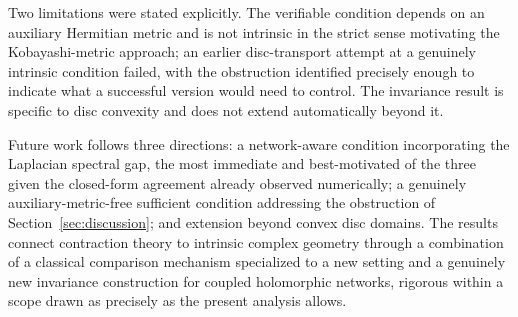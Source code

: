 \documentclass[preprint,12pt,authoryear]{elsarticle}
\begin{document}
Two limitations were stated explicitly. The verifiable condition depends on an auxiliary Hermitian metric and is not intrinsic in the strict sense motivating the Kobayashi-metric approach; an earlier disc-transport attempt at a genuinely intrinsic condition failed, with the obstruction identified precisely enough to indicate what a successful version would need to control. The invariance result is specific to disc convexity and does not extend automatically beyond it.

Future work follows three directions: a network-aware condition incorporating the Laplacian spectral gap, the most immediate and best-motivated of the three given the closed-form agreement already observed numerically; a genuinely auxiliary-metric-free sufficient condition addressing the obstruction of Section~\ref{sec:discussion}; and extension beyond convex disc domains. The results connect contraction theory to intrinsic complex geometry through a combination of a classical comparison mechanism specialized to a new setting and a genuinely new invariance construction for coupled holomorphic networks, rigorous within a scope drawn as precisely as the present analysis allows.
\end{document}
